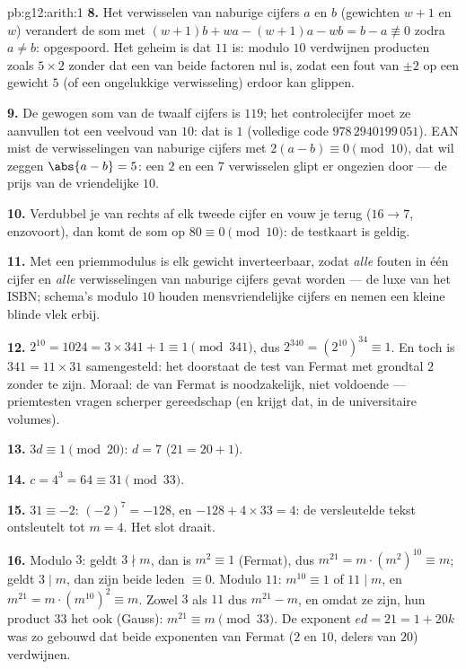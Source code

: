 \begin{solution}{pb:g12:arith:1}
\textbf{8.} Het verwisselen van naburige cijfers $a$ en $b$ (gewichten
$w + 1$ en $w$) verandert de som met
$(w+1)b + wa - (w+1)a - wb = b - a \not\equiv 0$ zodra $a \neq b$: opgespoord.
Het geheim is dat $11$ \emph{} is: modulo $10$ verdwijnen producten zoals
$5 \times 2$ zonder dat een van beide factoren nul is, zodat een fout van
$\pm 2$ op een gewicht $5$ (of een ongelukkige verwisseling) erdoor kan
glippen.

\textbf{9.} De gewogen som van de twaalf cijfers is $119$; het controlecijfer
moet ze aanvullen tot een veelvoud van $10$: dat is $1$ (volledige code
$978\,2940199\,051$). EAN mist de verwisselingen van naburige cijfers met
$2(a - b) \equiv 0 \pmod{10}$, dat wil zeggen $\abs{a - b} = 5$: een $2$ en
een $7$ verwisselen glipt er ongezien door --- de prijs van de vriendelijke
 $10$.

\textbf{10.} Verdubbel je van rechts af elk tweede cijfer en vouw je terug
($16 \to 7$, enzovoort), dan komt de som op $80 \equiv 0 \pmod{10}$: de
testkaart is geldig.

\textbf{11.} Met een priemmodulus is elk gewicht inverteerbaar, zodat
\emph{alle} fouten in één cijfer en \emph{alle} verwisselingen van naburige
cijfers gevat worden --- de luxe van het ISBN; schema's modulo $10$ houden
mensvriendelijke cijfers en nemen een kleine blinde vlek erbij.

\textbf{12.} $2^{10} = 1024 = 3 \times 341 + 1 \equiv 1 \pmod{341}$, dus
$2^{340} = \left(2^{10}\right)^{34} \equiv 1$. En toch is
$341 = 11 \times 31$ samengesteld: het doorstaat de test van Fermat met
grondtal $2$ zonder  te zijn. Moraal: de  van Fermat is
noodzakelijk, niet voldoende --- priemtesten vragen scherper gereedschap (en
krijgt dat, in de universitaire volumes).

\textbf{13.} $3d \equiv 1 \pmod{20}$: $d = 7$ ($21 = 20 + 1$).

\textbf{14.} $c = 4^3 = 64 \equiv 31 \pmod{33}$.

\textbf{15.} $31 \equiv -2$: $(-2)^7 = -128$, en $-128 + 4 \times 33 = 4$: de
versleutelde tekst ontsleutelt tot $m = 4$. Het slot draait.

\textbf{16.} Modulo $3$: geldt $3 \nmid m$, dan is $m^2 \equiv 1$ (Fermat),
dus $m^{21} = m \cdot \left(m^2\right)^{10} \equiv m$; geldt $3 \mid m$, dan
zijn beide leden $\equiv 0$. Modulo $11$: $m^{10} \equiv 1$ of $11 \mid m$, en
$m^{21} = m \cdot \left(m^{10}\right)^2 \equiv m$. Zowel $3$ als $11$ 
dus $m^{21} - m$, en omdat ze  zijn,  hun product $33$ het
ook (Gauss): $m^{21} \equiv m \pmod{33}$. De exponent $ed = 21 = 1 + 20k$ was
zo gebouwd dat beide exponenten van Fermat ($2$ en $10$, delers van $20$)
verdwijnen.


\end{solution}
